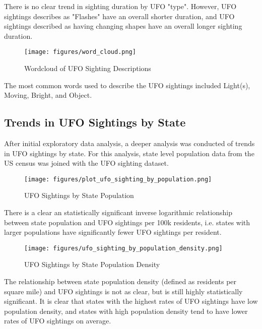 \documentclass{article}
\begin{document}
\par There is no clear trend in sighting duration by UFO "type". However, UFO sightings describes as "Flashes" have an overall shorter duration, and UFO sightings described as having changing shapes have an overall longer sighting duration. 

\begin{figure}
  \centering
  \texttt{[image: figures/word\_cloud.png]}
  \caption{Wordcloud of UFO Sighting Descriptions}
  \label{fig:wordcloud}
\end{figure}
\par The most common words used to describe the UFO sightings included Light(s), Moving, Bright, and Object. 

\subsection{Trends in UFO Sightings by State}
\par After initial exploratory data analysis, a deeper analysis was conducted of trends in UFO sightings by state. For this analysis, state level population data from the US census was joined with the UFO sighting dataset.

\begin{figure}[H]
  \centering
  \texttt{[image: figures/plot\_ufo\_sighting\_by\_population.png]}
  \caption{UFO Sightings by State Population}
  \label{fig:sightings_by_pop}
\end{figure}

\par There is a clear an statistically significant inverse logarithmic relationship between state population and UFO sightings per 100k residents, i.e. states with larger populations have significantly fewer UFO sightings per resident. 

\begin{figure}[H]
  \centering
  \texttt{[image: figures/ufo\_sighting\_by\_population\_density.png]}
  \caption{UFO Sightings by State Population Density}
  \label{fig:sightings_by_pop_density}
\end{figure}

\par The relationship between state population density (defined as residents per square mile) and UFO sightings is not as clear, but is still highly statistically significant. It is clear that states with the highest rates of UFO sightings have low population density, and states with high population density tend to have lower rates of UFO sightings on average.
\end{document}
